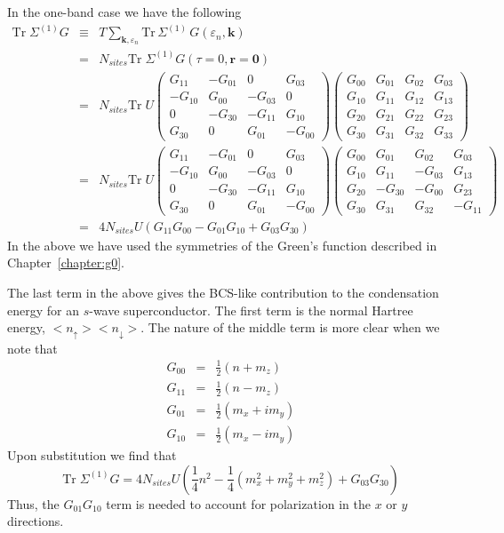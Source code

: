 In the one-band case we have the following
\begin{eqnarray}
\mathrm{Tr}\; \Sigma^{(1)} G & \equiv &
      T \sum_{\mathbf{k},\varepsilon_n}
 \textrm{Tr}\, \Sigma^{(1)}\, 
G(\varepsilon_n,\mathbf{k})
\\
& = & 
  N_{sites} 
\mathrm{Tr}\; \Sigma^{(1)} G(\tau=0,\mathbf{r}=\mathbf{0}) \\
 & = &   N_{sites} 
\mathrm{Tr}\; U
\begin{pmatrix}
G_{11} & -G_{01} & 0 & G_{03} \\
-G_{10} & G_{00} & -G_{03} & 0 \\
0  & -G_{30} & -G_{11} & G_{10} \\
G_{30} & 0 & G_{01} & -G_{00}
\end{pmatrix}
\begin{pmatrix}
G_{00} & G_{01} & G_{02} & G_{03} \\
G_{10} & G_{11} & G_{12} & G_{13} \\
G_{20}  & G_{21} & G_{22} & G_{23} \\
G_{30} & G_{31} & G_{32} & G_{33}
\end{pmatrix}
\\
& = &
 N_{sites} 
\mathrm{Tr}\; U
\begin{pmatrix}
G_{11} & -G_{01} & 0 & G_{03} \\
-G_{10} & G_{00} & -G_{03} & 0 \\
0  & -G_{30} & -G_{11} & G_{10} \\
G_{30} & 0 & G_{01} & -G_{00}
\end{pmatrix}
\begin{pmatrix}
G_{00} & G_{01} & G_{02} & G_{03} \\
G_{10} & G_{11} & -G_{03} & G_{13} \\
G_{20}  & -G_{30} & -G_{00} & G_{23} \\
G_{30} & G_{31} & G_{32} & -G_{11}
\end{pmatrix}
\\
& = & 4 N_{sites} U (G_{11}G_{00} - G_{01}G_{10} + G_{03}G_{30}) 
\end{eqnarray}
In the above we have used the symmetries of the Green's function
described in Chapter~\ref{chapter:g0}.

The last term in the above gives the BCS-like contribution to
the condensation energy for an $s$-wave superconductor.  The 
first term is the normal Hartree energy, $<n_{\uparrow}><n_{\downarrow}>$.
The nature of the middle term is more clear when we note that
\begin{eqnarray}
G_{00} & = & \frac{1}{2}( n + m_z) \\
G_{11} & = & \frac{1}{2}( n - m_z) \\
G_{01} & = & \frac{1}{2}( m_x + i m_y) \\
G_{10} & = & \frac{1}{2}( m_x - i m_y)
\end{eqnarray}
Upon substitution we find that
\begin{equation}
\mathrm{Tr}\; \Sigma^{(1)} G = 4 N_{sites} U 
\left( \frac{1}{4} n^2 - \frac{1}{4}(m_x^2 + m_y^2 + m_z^2)
+ G_{03}G_{30} \right)
\end{equation}
Thus, the $G_{01}G_{10}$ term is needed to account for
polarization in the $x$ or $y$ directions.

